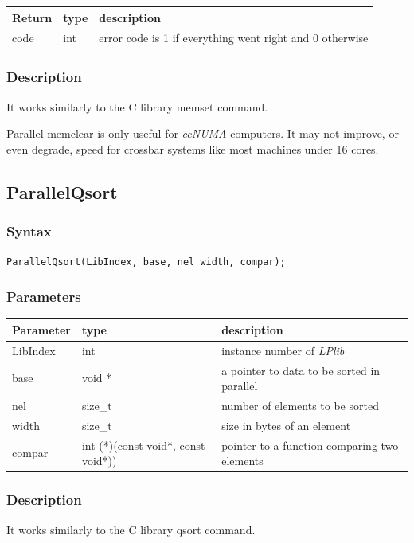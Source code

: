 \documentclass[a4paper,12pt]{article}
\begin{document}
\medskip

\noindent
\begin{tabular}{|m{2cm}|m{1.5cm}|m{10.5cm}|}
\hline
Return     & type   & description \\
\hline
code       & int    & error code is 1 if everything went right and 0 otherwise \\
\hline
\end{tabular}

\subsubsection*{Description}
It works similarly to the C library memset command.

Parallel memclear is only useful for \emph{ccNUMA} computers. It may not improve, or even degrade, speed for crossbar systems like most machines under 16 cores.


\subsection{ParallelQsort}

\subsubsection*{Syntax}
\tt{ParallelQsort(LibIndex, base, nel width, compar);}
\normalfont

\subsubsection*{Parameters}
\begin{tabular}{|m{2cm}|m{4cm}|m{8cm}|}
\hline
Parameter  & type   & description \\
\hline
LibIndex   & int    & instance number of \emph{LPlib} \\
\hline
base       & void * & a pointer to data to be sorted in parallel \\
\hline
nel        & size\_t & number of elements to be sorted \\
\hline
width      & size\_t & size in bytes of an element \\
\hline
compar     & int (*)(const void*, const void*)) & pointer to a function comparing two elements \\
\hline
\end{tabular}

\subsubsection*{Description}
It works similarly to the C library qsort command.
\end{document}
